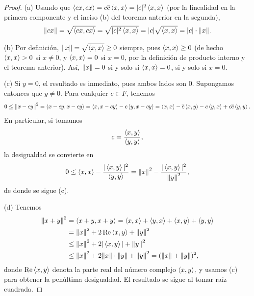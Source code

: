 \documentclass[12pt,a4paper]{book}
\begin{document}
    \begin{proof}
        (a) Usando que $\left\langle cx, cx \right\rangle=c\overline{c}\left\langle x, x \right\rangle=|c|^2\left\langle x, x \right\rangle$ (por la linealidad en la primera componente y el inciso (b) del teorema anterior en la segunda),
        \begin{equation*}
            \norm{cx}=\sqrt{\left\langle cx, cx \right\rangle}=\sqrt{|c|^2\left\langle x, x \right\rangle}=|c|\sqrt{\left\langle x, x \right\rangle}=|c|\cdot\norm{x}.
        \end{equation*}

        (b) Por definición, $\norm{x}=\sqrt{\left\langle x, x \right\rangle}\geq 0$ siempre, pues $\left\langle x, x \right\rangle\geq 0$ (de hecho $\left\langle x, x \right\rangle>0$ si $x\neq 0$, y $\left\langle x, x \right\rangle=0$ si $x=0$, por la definición de producto interno y el teorema anterior). Así, $\norm{x}=0$ si y solo si $\left\langle x, x \right\rangle=0$, si y solo si $x=0$.

        (c) Si $y=0$, el resultado es inmediato, pues ambos lados son $0$. Supongamos entonces que $y\neq 0$. Para cualquier $c\in F$, tenemos
        \begin{align*}
            0\leq\norm{x-cy}^2=\left\langle x-cy, x-cy \right\rangle=\left\langle x, x-cy \right\rangle-c\left\langle y, x-cy \right\rangle=\left\langle x, x \right\rangle-\overline{c}\left\langle x, y \right\rangle-c\left\langle y, x \right\rangle+c\overline{c}\left\langle y, y \right\rangle.
        \end{align*}
        En particular, si tomamos
        \begin{equation*}
            c=\frac{\left\langle x, y \right\rangle}{\left\langle y, y \right\rangle},
        \end{equation*}
        la desigualdad se convierte en
        \begin{equation*}
            0\leq\left\langle x, x \right\rangle-\frac{|\left\langle x, y \right\rangle|^2}{\left\langle y, y \right\rangle}=\norm{x}^2-\frac{|\left\langle x, y \right\rangle|^2}{\norm{y}^2},
        \end{equation*}
        de donde se sigue (c).

        (d) Tenemos
        \begin{align*}
            \norm{x+y}^2&=\left\langle x+y, x+y \right\rangle=\left\langle x, x \right\rangle+\left\langle y, x \right\rangle+\left\langle x, y \right\rangle+\left\langle y, y \right\rangle\\
            &=\norm{x}^2+2\Re\left\langle x, y \right\rangle+\norm{y}^2\\
            &\leq\norm{x}^2+2|\left\langle x, y \right\rangle|+\norm{y}^2\\
            &\leq\norm{x}^2+2\norm{x}\cdot\norm{y}+\norm{y}^2=(\norm{x}+\norm{y})^2,
        \end{align*}
        donde $\Re\left\langle x, y \right\rangle$ denota la parte real del número complejo $\left\langle x, y \right\rangle$, y usamos (c) para obtener la penúltima desigualdad. El resultado se sigue al tomar raíz cuadrada.
    \end{proof}
\end{document}
